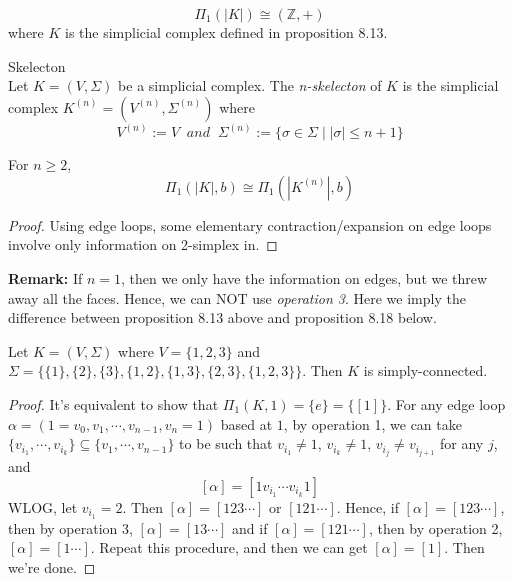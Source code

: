 \begin{corollary}
    $$\Pi_1 (|K|) \cong (\mathbb{Z},+)$$
    where $K$ is the simplicial complex defined in proposition 8.13.
\end{corollary}

\begin{definition}{Skelecton}\\
Let $K = (V, \Sigma)$ be a simplicial complex. The \textit{n-skelecton} of $K$ is the simplicial complex $K^{(n)} = (V^{(n)} , \Sigma^{(n)})$ where 
$$V^{(n)} := V\;\;and\;\; \Sigma^{(n)} := \{ \sigma \in \Sigma \mid |\sigma| \leq n+1 \}$$
\end{definition}

\begin{corollary}
    For $n \geq 2$,
    $$\Pi_1 (|K|, b) \cong \Pi_1 (|K^{(n)}|,b)$$
\end{corollary}

\begin{proof}
    Using edge loops, some elementary contraction/expansion on edge loops involve only information on 2-simplex in.
\end{proof}

\noindent\textbf{Remark:} If $n=1$, then we only have the information on edges, but we threw away all the faces. Hence, we can NOT use \textit{operation 3}. Here we imply the difference between proposition 8.13 above and proposition 8.18 below.

\begin{proposition}
    Let $K = (V, \Sigma)$ where $V = \{1,2,3\}$ and $\Sigma =\{ \{1\},\{2 \},\{3\} ,\{1,2\}, \{1,3\}, \{2,3\}, \{1,2,3\} \}$. Then $K$ is simply-connected.
\end{proposition}

\begin{proof}
    It's equivalent to show that $\Pi_1 (K,1) = \{ e\} = \{ [1]\}$. For any edge loop $\alpha = (1=v_0, v_1, \cdots, v_{n-1} , v_n=1)$ based at $1$, by operation 1, we can take $\{v_{i_1} ,\cdots, v_{i_k} \} \subseteq \{ v_1 ,\cdots, v_{n-1} \}$ to be such that $v_{i_1} \neq 1$, $v_{i_k} \neq 1$, $v_{i_j} \neq v_{i_{j+1}}$ for any $j$, and
    $$[\alpha] = [1 v_{i_1} \cdots v_{i_k}1]$$
    WLOG, let $v_{i_1} =2$. Then $[\alpha] = [123 \cdots]$ or $[121 \cdots]$. Hence, if $[\alpha] = [123 \cdots]$, then by operation 3, $[\alpha] = [13 \cdots]$ and if $[\alpha] = [121 \cdots]$, then by operation 2, $[\alpha] = [1 \cdots]$. Repeat this procedure, and then we can get $[\alpha] = [1]$. Then we're done.
\end{proof}

